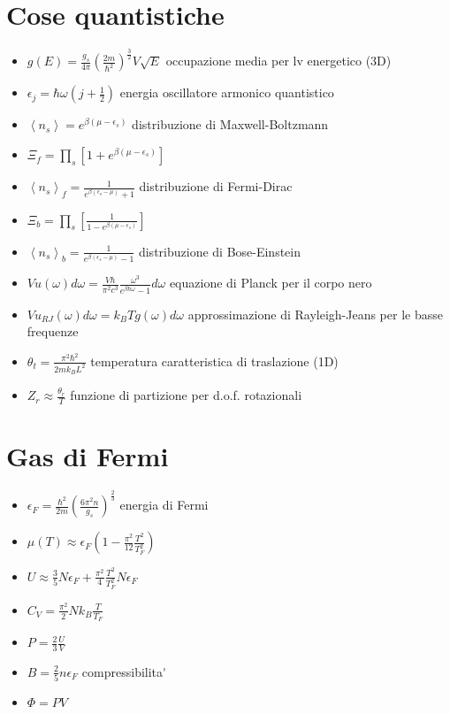 \documentclass[a4paper]{article}
\begin{document}
    \section{Cose quantistiche}
        \begin{itemize}
            \item $g(E)=\frac{g_s}{4\pi}\left(\frac{2m}{\hbar^2}\right)^{\frac{3}{2}}V\sqrt{E}$ occupazione media per lv energetico (3D)
            \item $\epsilon_j=\hbar\omega\left(j+\frac{1}{2}\right)$ energia oscillatore armonico quantistico
            \item $\left\langle n_s \right\rangle=e^{\beta(\mu-\epsilon_s)}$ distribuzione di Maxwell-Boltzmann
            \item $\Xi_f=\prod_s\left[1+e^{\beta(\mu-\epsilon_s)}\right]$
            \item $\left\langle n_s \right\rangle_f=\frac{1}{e^{\beta(\epsilon_s-\mu)}+1}$ distribuzione di Fermi-Dirac
            \item $\Xi_b=\prod_s\left[\frac{1}{1-e^{\beta(\mu-\epsilon_s)}}\right]$
            \item $\left\langle n_s \right\rangle_b=\frac{1}{e^{\beta(\epsilon_s-\mu)}-1}$ distribuzione di Bose-Einstein
            \item $Vu(\omega)d\omega=\frac{V\hbar}{\pi^2c^3}\frac{\omega^3}{e^{\beta\hbar\omega}-1}d\omega$ equazione di Planck per il corpo nero
            \item $Vu_{RJ}(\omega)d\omega=k_BTg(\omega)d\omega$ approssimazione di Rayleigh-Jeans per le basse frequenze
            \item $\theta_t=\frac{\pi^2\hbar^2}{2mk_BL^2}$ temperatura caratteristica di traslazione (1D)
            \item $Z_r\approx \frac{\theta_r}{T}$ funzione di partizione per d.o.f. rotazionali
        \end{itemize}

    \section{Gas di Fermi}
        \begin{itemize}
            \item $\epsilon_F=\frac{\hbar^2}{2m}\left(\frac{6\pi^2n}{g_s}\right)^{\frac{2}{3}}$ energia di Fermi
            \item $\mu(T)\approx\epsilon_F\left(1-\frac{\pi^2}{12}\frac{T^2}{T_F^2}\right)$
            \item $U\approx\frac{3}{5}N\epsilon_F+\frac{\pi^2}{4}\frac{T^2}{T_F^2}N\epsilon_F$
            \item $C_V=\frac{\pi^2}{2}Nk_B\frac{T}{T_F}$
            \item $P=\frac{2}{3}\frac{U}{V}$
            \item $B=\frac{2}{5}n\epsilon_F$ compressibilita\'
            \item $\Phi=PV$
        \end{itemize}
\end{document}
